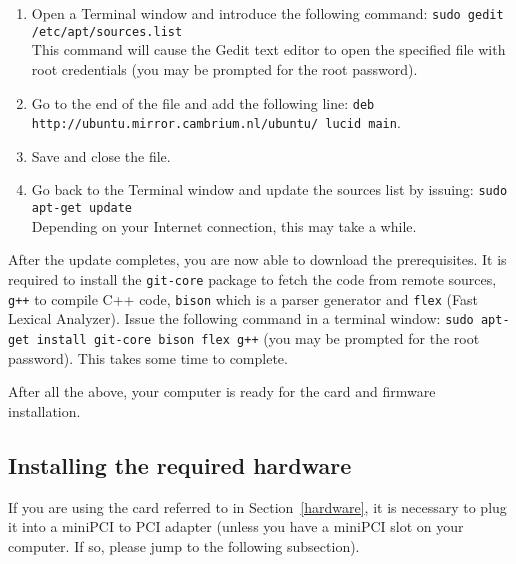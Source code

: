 \documentclass[conference]{IEEEtran}
\begin{document}
\begin{enumerate}
	\item  Open a Terminal window and introduce the following command: \texttt{sudo gedit /etc/apt/sources.list} \\ This command will cause the Gedit text editor to open the specified file with root credentials (you may be prompted for the root password).
	\item Go to the end of the file and add the following line: \texttt{deb http://ubuntu.mirror.cambrium.nl/ubuntu/ lucid main}.
	\item Save and close the file.
	\item Go back to the Terminal window and update the sources list by issuing: \texttt{sudo apt-get update} \\ Depending on your Internet connection, this may take a while.
\end{enumerate}




After the update completes, you are now able to download the prerequisites. It is required to install the \texttt{git-core} package to fetch the code from remote sources, \texttt{g++} to compile C++ code, \texttt{bison} which is a parser generator and \texttt{flex} (Fast Lexical Analyzer). Issue the following command in a terminal window: \texttt{sudo apt-get install git-core bison flex g++} (you may be prompted for the root password). This takes some time to complete.

After all the above, your computer is ready for the card and firmware installation.

\subsection{Installing the required hardware}

If you are using the card referred to in Section~\ref{hardware}, it is necessary to plug it into a miniPCI to PCI adapter (unless you have a miniPCI slot on your computer. If so, please jump to the following subsection). 
\end{document}
